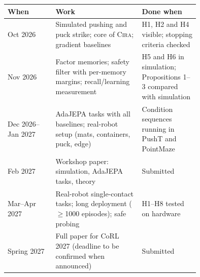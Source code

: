 \documentclass[10pt]{article}
\newcommand{\method}{\textsc{Cira}}
\begin{document}
\begin{center}
\small
\begin{tabular}{lp{0.45\linewidth}p{0.3\linewidth}}
\toprule
When & Work & Done when \\
\midrule
Oct 2026 & Simulated pushing and puck strike; core of \method{}; gradient baselines & H1, H2 and H4 visible; stopping criteria checked \\
Nov 2026 & Factor memories; safety filter with per-memory margins; recall/learning measurement & H5 and H6 in simulation; Propositions 1--3 compared with simulation \\
Dec 2026--Jan 2027 & AdaJEPA tasks with all baselines; real-robot setup (mats, containers, puck, edge) & Condition sequences running in PushT and PointMaze \\
Feb 2027 & Workshop paper: simulation, AdaJEPA tasks, theory & Submitted \\
Mar--Apr 2027 & Real-robot single-contact tasks; long deployment ($\ge$1000 episodes); safe probing & H1--H8 tested on hardware \\
Spring 2027 & Full paper for CoRL 2027 (deadline to be confirmed when announced) & Submitted \\
\bottomrule
\end{tabular}
\end{center}

\begingroup
\small
\setlength{\bibsep}{1pt}


\endgroup
\end{document}
